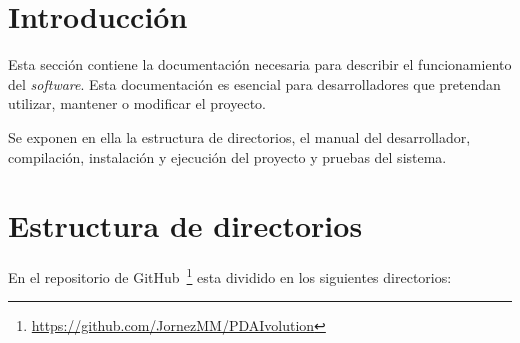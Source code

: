 
\section{Introducción}
Esta sección contiene la documentación necesaria para describir el funcionamiento del \textit{software}. Esta documentación es esencial para desarrolladores que pretendan utilizar, mantener o modificar el proyecto.

Se exponen en ella la estructura de directorios, el manual del desarrollador, compilación, instalación y ejecución del proyecto y pruebas del sistema.

\section{Estructura de directorios}
En el repositorio de GitHub~\footnote{\url{https://github.com/JornezMM/PDAIvolution}} esta dividido en los siguientes directorios:

\newpage

